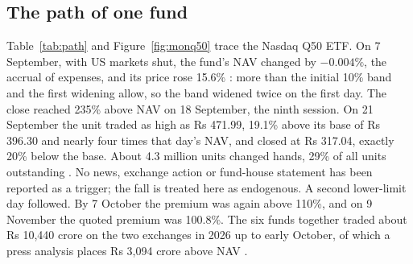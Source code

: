 \subsection{The path of one fund}
Table~\ref{tab:path} and Figure~\ref{fig:monq50} trace the Nasdaq Q50 ETF. On 7 September, with US markets shut, the fund's NAV changed by $-0.004\%$, the accrual of expenses, and its price rose 15.6\% \citep{vr2026rs96}: more than the initial 10\% band and the first widening allow, so the band widened twice on the first day. The close reached 235\% above NAV on 18 September, the ninth session. On 21 September the unit traded as high as Rs 471.99, 19.1\% above its base of Rs 396.30 and nearly four times that day's NAV, and closed at Rs 317.04, exactly 20\% below the base. About 4.3 million units changed hands, 29\% of all units outstanding \citep{indmoney2026penny,whalesbook2026}. No news, exchange action or fund-house statement has been reported as a trigger; the fall is treated here as endogenous. A second lower-limit day followed. By 7 October the premium was again above 110\%, and on 9 November the quoted premium was 100.8\%. The six funds together traded about Rs 10,440 crore on the two exchanges in 2026 up to early October, of which a press analysis places Rs 3,094 crore above NAV \citep{businessline2026}.

